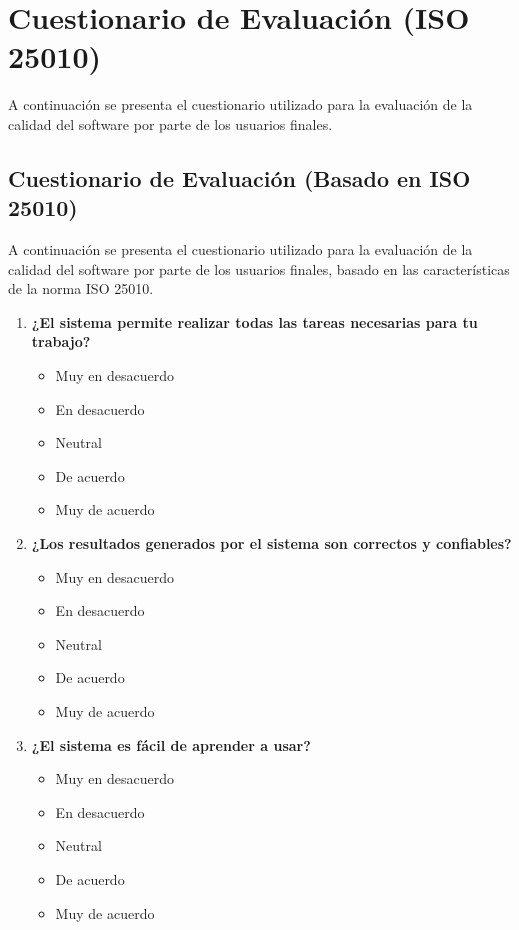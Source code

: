\documentclass[conference]{IEEEtran}
\begin{document}
\section{Cuestionario de Evaluación (ISO 25010)}
A continuación se presenta el cuestionario utilizado para la evaluación de la calidad del software por parte de los usuarios finales.
\subsection{Cuestionario de Evaluación (Basado en ISO 25010)}
A continuación se presenta el cuestionario utilizado para la evaluación de la calidad del software por parte de los usuarios finales, basado en las características de la norma ISO 25010.

\begin{enumerate}
    \item \textbf{¿El sistema permite realizar todas las tareas necesarias para tu trabajo?}
        \begin{itemize}
            \item Muy en desacuerdo
            \item En desacuerdo
            \item Neutral
            \item De acuerdo
            \item Muy de acuerdo
        \end{itemize}

    \item \textbf{¿Los resultados generados por el sistema son correctos y confiables?}
        \begin{itemize}
            \item Muy en desacuerdo
            \item En desacuerdo
            \item Neutral
            \item De acuerdo
            \item Muy de acuerdo
        \end{itemize}
        
    \item \textbf{¿El sistema es fácil de aprender a usar?}
        \begin{itemize}
            \item Muy en desacuerdo
            \item En desacuerdo
            \item Neutral
            \item De acuerdo
            \item Muy de acuerdo
        \end{itemize}
        

\end{enumerate}
\end{document}

